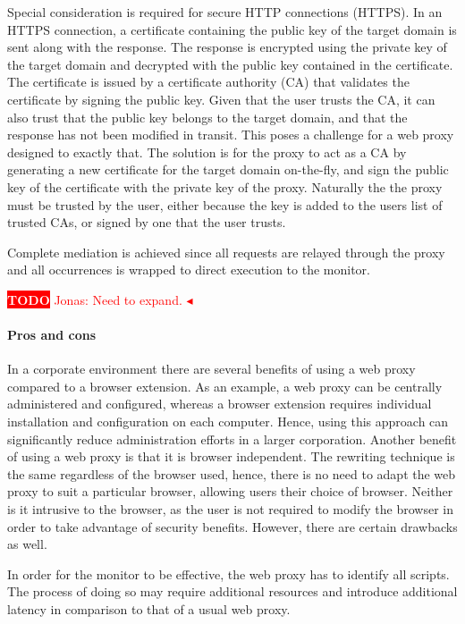 \documentclass{llncs}
\newcommand{\todo}[1]{\colorbox{red}{\textcolor{white}{\sffamily\bfseries\scriptsize TODO}} \textcolor{red}{#1} \textcolor{red}{$\blacktriangleleft$}}
\begin{document}
Special consideration is required for secure HTTP connections (HTTPS). In an HTTPS 
connection, a certificate containing the public key of the target domain is sent 
along with the response. The response is encrypted using the private key of the target 
domain and decrypted with the public key contained in the certificate. The 
certificate is issued by a certificate authority (CA)
that validates the certificate by signing the public key. Given that the user 
trusts the CA, it can also trust that the public key belongs 
to the target domain, and that the response has not been modified in transit.
This poses a challenge for a web proxy designed to exactly that. The solution 
is for the proxy to act as a CA by generating a
new certificate for the target domain on-the-fly, and sign the 
public key of the certificate with the private key of the proxy. Naturally the 
the proxy must be trusted by the user, either because the key is added to 
the users list of trusted CAs, or signed by one that the user trusts.

Complete mediation is achieved since all requests are relayed through the proxy 
and all occurrences is wrapped to direct execution to the monitor.

\todo{Jonas: Need to expand.}

\paragraph{Pros and cons}

In a corporate environment there are several benefits of using a web proxy 
compared to a browser extension. As an example, a web proxy can be centrally 
administered and configured, whereas a browser extension requires individual installation 
and configuration on each computer. Hence, using this approach can significantly 
reduce administration efforts in a larger corporation. 
Another benefit of using a web proxy is that it is browser independent. The 
rewriting technique is the same regardless of the browser used, hence, there is no 
need to adapt the web proxy to suit a particular browser, allowing 
users their choice of browser.
Neither is it intrusive to the browser, as the user is not required to modify the 
browser in order to take advantage of security benefits. 
However, there 
are certain drawbacks as well. 

In order for the monitor to be effective, the web proxy 
has to identify all scripts. The process of doing so may require additional 
resources and introduce additional 
latency in comparison to that of a usual web proxy.
\end{document}
